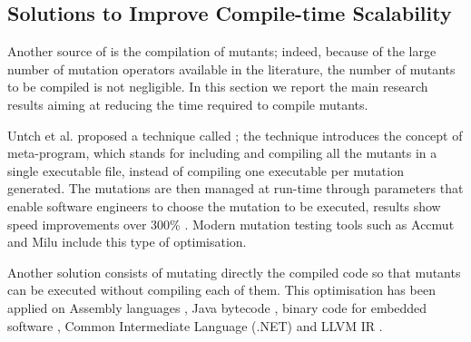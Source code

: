 
\subsection{Solutions to Improve Compile-time Scalability}
\label{sub:compileTime}
\label{sec:opt:selection}

Another source of  is the compilation of mutants;
indeed, because of the large number of mutation operators available in the literature, the number of mutants to be compiled is not negligible. In this section we report the main research results aiming at reducing the time required to compile mutants.

Untch et al. \cite{untch1993mutation} proposed a technique called ; the technique introduces the concept of meta-program, which stands for including and compiling all the mutants in a single executable file, instead of compiling one executable per mutation generated. The mutations are then managed at run-time through parameters that enable software engineers to choose the mutation to be executed, results show speed improvements over 300\% \cite{untch1993mutation,papadakis2010automatic}. Modern mutation testing tools such as Accmut \cite{wang2017faster} and Milu \cite{jia2008milu} include this type of optimisation.

Another solution consists of mutating directly the compiled code so that mutants can be executed without compiling each of them.
This optimisation has been applied on 
Assembly languages \cite{crouzet2006sesame},
Java bytecode \cite{ma2006mujava}, 
binary code for embedded software \cite{becker2012xemu},
Common Intermediate Language (.NET) \cite{derezinska2011object} 
and LLVM IR \cite{hariri2016evaluating}. 

